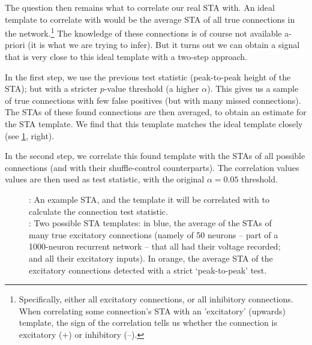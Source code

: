 The question then remains what to correlate our real STA with. An ideal template to correlate with would be the average STA of all true connections in the network.\footnote
{Specifically, either all excitatory connections, or all inhibitory connections.
When correlating some connection's STA with an 'excitatory'  (upwards) template, the sign of the correlation tells us whether the connection is excitatory ($+$) or inhibitory ($–$).}
The knowledge of these connections is of course not available a-priori (it is what we are trying to infer). But it turns out we can obtain a signal that is very close to this ideal template with a two-step approach.

In the first step, we use the previous test statistic (peak-to-peak height of the STA); but with a stricter $p$-value threshold (a higher $α$). This gives us a sample of true connections with few false positives (but with many missed connections). The STAs of these found connections are then averaged, to obtain an estimate for the STA template. We find that this template matches the ideal template closely (see \cref{fig:corr}, right).

In the second step, we correlate this found template with the STAs of all possible connections (and with their shuffle-control counterparts). The correlation values values are then used as test statistic, with the original $α = 0.05$ threshold.


\begin{figure}
    {\Left: An example STA, and the template it will be correlated with to calculate the connection test statistic.\\
    \Right: Two possible STA templates: in blue, the average of the STAs of many true excitatory connections (namely of 50 neurons -- part of a 1000-neuron recurrent network -- that all had their voltage recorded; and all their excitatory inputs).
    In orange, the average STA of the excitatory connections detected with a strict `peak-to-peak' test.}
    \label{fig:corr}
\end{figure}

